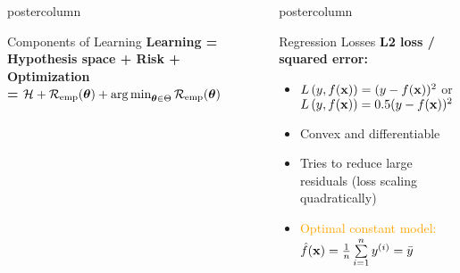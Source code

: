 \documentclass{beamer}
\newlength{\columnheight} %
\begin{document}
\begin{frame}[fragile]{}
\begin{columns}
\begin{column}{.31\textwidth}
\begin{beamercolorbox}[center]{postercolumn}
\begin{minipage}{.98\textwidth}
{\begin{myblock}{Components of Learning}
\textbf{Learning = Hypothesis space + Risk + Optimization} \\
 \textbf{= }$ \mathcal{H} + \mathcal{R}_{\text{emp}}(\bm{\theta}) + \operatorname{arg\,min}_{\bm{\theta} \in \Theta} 
\mathcal{R}_{\text{emp}}(\bm{\theta})$

% 
% 
% 
% 
% 
% 
% 
% 
% 


\end{myblock}




				}
			\end{minipage}
		\end{beamercolorbox}
	\end{column}
	\begin{column}{.31\textwidth}
		\begin{beamercolorbox}[center]{postercolumn}
			\begin{minipage}{.98\textwidth}
				\parbox[t][\columnheight]{\textwidth}{


\begin{myblock}{Regression Losses}
  \textbf{L2 loss / squared error:} 
\begin{itemize}    
  \setlength{\itemindent}{+.3in}
  \item $L\left(y, f(\mathbf{x})\right) = (y-f(\mathbf{x}))^2$ or $L\left(y, f(\mathbf{x})\right) = 0.5 (y-f(\mathbf{x}))^2$
  \item Convex and differentiable
  \item Tries to reduce large residuals (loss scaling quadratically)
  \item \textcolor{orange}{Optimal constant model: $\hat{f}(\mathbf{x}) = \frac{1}{n} \sum\limits_{i=1}^n y^{(i)} =
  \bar{y}$}
\end{itemize}


\end{myblock}}
\end{minipage}
\end{beamercolorbox}
\end{column}
\end{columns}
\end{frame}
\end{document}

